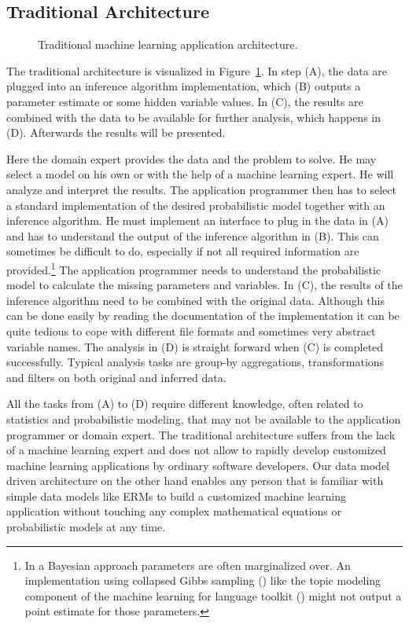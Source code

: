 \subsection{Traditional Architecture}

\begin{figure}[t]
\centering
\scalebox{\tikzScale}{\adjustTikzSize }
\caption[Traditional machine learning application architecture]{Traditional machine learning application architecture.}\label{fig:ml-application-architecture}
\end{figure}

The traditional architecture is visualized in Figure~\ref{fig:ml-application-architecture}. In step (A), the data are plugged into an inference algorithm implementation, which (B) outputs a parameter estimate or some hidden variable values. In (C), the results are combined with the data to be available for further analysis, which happens in (D). Afterwards the results will be presented.

Here the domain expert provides the data and the problem to solve. He may select a model on his own or with the help of a machine learning expert. He will analyze and interpret the results. The application programmer then has to select a standard implementation of the desired probabilistic model together with an inference algorithm. He must implement an interface to plug in the data in (A) and has to understand the output of the inference algorithm in (B). This can sometimes be difficult to do, especially if not all required information are provided.\footnote{In a Bayesian approach parameters are often marginalized over. An implementation using collapsed Gibbs sampling (\cite{liu1994collapsed}) like the topic modeling component of the machine learning for language toolkit (\cite{mccallum2002mallet}) might not output a point estimate for those parameters.} The application programmer needs to understand the probabilistic model to calculate the missing parameters and variables. In (C), the results of the inference algorithm need to be combined with the original data. Although this can be done easily by reading the documentation of the implementation it can be quite tedious to cope with different file formats and sometimes very abstract variable names. The analysis in (D) is straight forward when (C) is completed successfully. Typical analysis tasks are group-by aggregations, transformations and filters on both original and inferred data.

All the tasks from (A) to (D) require different knowledge, often related to statistics and probabilistic modeling, that may not be available to the application programmer or domain expert. The traditional architecture suffers from the lack of a machine learning expert and does not allow to rapidly develop customized machine learning applications by ordinary software developers. Our data model driven architecture on the other hand enables any person that is familiar with simple data models like ERMs to build a customized machine learning application without touching any complex mathematical equations or probabilistic models at any time.

